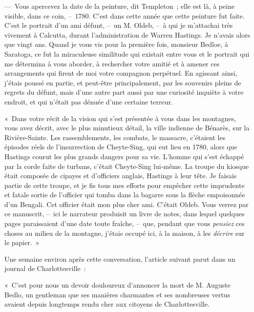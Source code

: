 \documentclass[french,twoside]{book} %
\begin{document}
— Vous apercevez la date de la peinture, dit Templeton ; elle est là, à peine visible, dans ce coin, – 1780. C’est dans cette année que cette peinture fut faite. C’est le portrait d’un ami défunt, – un M. Oldeb, – à qui je m’attachai très vivement à Calcutta, durant l’administration de Warren Hastings. Je n’avais alors que vingt ans. Quand je vous vis pour la première fois, monsieur Bedloe, à Saratoga, ce fut la miraculeuse similitude qui existait entre vous et le portrait qui me détermina à vous aborder, à rechercher votre amitié et à amener ces arrangements qui firent de moi votre compagnon perpétuel. En agissant ainsi, j’étais poussé en partie, et peut-être principalement, par les souvenirs pleins de regrets du défunt, mais d’une autre part aussi par une curiosité inquiète à votre endroit, et qui n’était pas dénuée d’une certaine terreur.\par
« Dans votre récit de la vision qui s’est présentée à vous dans les montagnes, vous avez décrit, avec le plus minutieux détail, la ville indienne de Bénarès, sur la Rivière-Sainte. Les rassemblements, les combats, le massacre, c’étaient les épisodes réels de l’insurrection de Cheyte-Sing, qui eut lieu en 1780, alors que Hastings courut les plus grands dangers pour sa vie. L’homme qui s’est échappé par la corde faite de turbans, c’était Cheyte-Sing lui-même. La troupe du kiosque était composée de cipayes et d’officiers anglais, Hastings à leur tête. Je faisais partie de cette troupe, et je fis tous mes efforts pour empêcher cette imprudente et fatale sortie de l’officier qui tomba dans la bagarre sous la flèche empoisonnée d’un Bengali. Cet officier était mon plus cher ami. C’était Oldeb. Vous verrez par ce manuscrit, – ici le narrateur produisit un livre de notes, dans lequel quelques pages paraissaient d’une date toute fraîche, – que, pendant que vous \emph{pensiez} ces choses au milieu de la montagne, j’étais occupé ici, à la maison, à les \emph{décrire} sur le papier. »\par
Une semaine environ après cette conversation, l’article suivant parut dans un journal de Charlottesville :\par
« C’est pour nous un devoir douloureux d’annoncer la mort de M. Auguste Bedlo, un gentleman que ses manières charmantes et ses nombreuses vertus avaient depuis longtemps rendu cher aux citoyens de Charlottesville.\par
\end{document}
